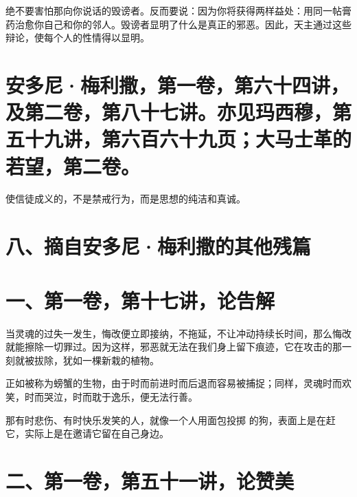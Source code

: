 绝不要害怕那向你说话的毁谤者。反而要说：因为你将获得两样益处：用同一帖膏药治愈你自己和你的邻人。毁谤者显明了什么是真正的邪恶。因此，天主通过这些辩论，使每个人的性情得以显明。\par


\section{安多尼·梅利撒，第一卷，第六十四讲，及第二卷，第八十七讲。亦见玛西穆，第五十九讲，第六百六十九页；大马士革的若望，第二卷。}

使信徒成义的，不是禁戒行为，而是思想的纯洁和真诚。\par


\section{八、摘自安多尼·梅利撒的其他残篇}


\section{一、第一卷，第十七讲，论告解}

当灵魂的过失一发生，悔改便立即接纳，不拖延，不让冲动持续长时间，那么悔改就能擦除一切罪过。因为这样，邪恶就无法在我们身上留下痕迹，它在攻击的那一刻就被拔除，犹如一棵新栽的植物。\par

正如被称为螃蟹的生物，由于时而前进时而后退而容易被捕捉；同样，灵魂时而欢笑，时而哭泣，时而耽于逸乐，便无法行善。\par

那有时悲伤、有时快乐发笑的人，就像一个人用面包投掷  的狗，表面上是在赶它，实际上是在邀请它留在自己身边。\par


\section{二、第一卷，第五十一讲，论赞美}

